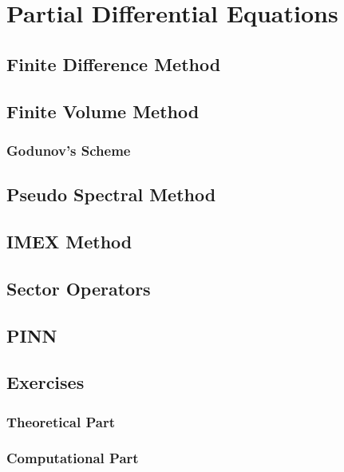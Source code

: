\chapter{Partial Differential Equations}

\section{Finite Difference Method}


\section{Finite Volume Method}
\subsection{Godunov's Scheme}
\section{Pseudo Spectral Method}

\section{IMEX Method}

\section{Sector Operators}


\section{PINN}

\section{Exercises}
\subsection{Theoretical Part}
\subsection{Computational Part}